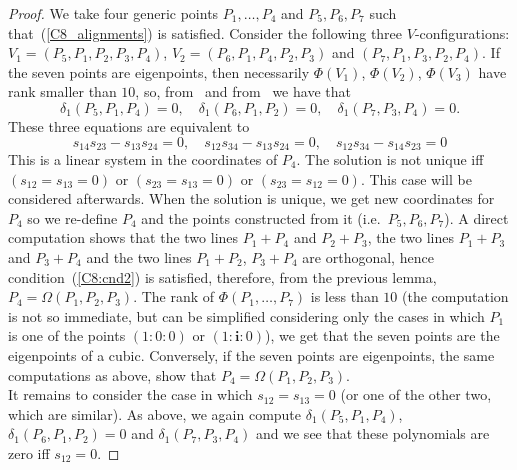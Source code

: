 \documentclass{amsart}
\theoremstyle{plain}
\theoremstyle{definition}
\newcommand{\iii}{\textbf{i}}
\begin{document}
\begin{proof}
We take four generic points
$P_1, \dots, P_4$ and $P_5, P_6, P_7$ such that~(\ref{C8_alignments})
is satisfied. Consider the following three $V$-configurations:
$V_1 = (P_5, P_1, P_2, P_3, P_4)$, $V_2 = (P_6, P_1, P_4, P_2, P_3)$
and $(P_7, P_1, P_3, P_2, P_4)$. If the seven points are eigenpoints,
then necessarily $\Phi(V_1)$, $\Phi(V_2)$, $\Phi(V_3)$ have rank
smaller than $10$, so, from~ and
from~
we have that 
\[
\delta_1(P_5, P_1, P_4) = 0, \quad \delta_1(P_6, P_1, P_2) = 0, \quad 
\delta_1(P_7, P_3, P_4) = 0.
\]
These three equations are equivalent to
\[
s_{14}s_{23}-s_{13}s_{24} = 0, \quad s_{12}s_{34}-s_{13}s_{24} = 0,
\quad s_{12}s_{34}-s_{14}s_{23} = 0
\]
This is a linear system in the coordinates of $P_4$. The solution is
not unique iff $(s_{12} = s_{13} = 0)$ or $(s_{23} = s_{13} = 0)$
or $(s_{23} = s_{12} = 0)$. This case will be considered afterwards.
When the solution is unique, we get new coordinates for $P_4$ so we
re-define $P_4$ and the points constructed from it (i.e.\ $P_5, P_6, P_7$).
A direct computation shows that the two lines $P_1+P_4$ and $P_2+P_3$,
the two lines $P_1+P_3$ and $P_3+P_4$ and the two lines $P_1+P_2$, $P_3+P_4$
are orthogonal, hence condition~(\ref{C8:cnd2}) is satisfied,
therefore, from the
previous lemma, $P_4 = \Omega(P_1, P_2, P_3)$. The rank
of $\Phi(P_1, \dotsc, P_7)$ is less than $10$ (the computation is
not so immediate, but can be simplified considering only the
cases in which $P_1$ is one of the points $(1: 0: 0)$ or
$(1: \iii: 0)$), we get that the seven points
are the eigenpoints of a cubic. Conversely, if the seven points are
eigenpoints, the same computations as above, show that
$P_4 = \Omega(P_1, P_2, P_3)$.\\
It remains to consider the case in which $s_{12} = s_{13} = 0$ (or one of
the other two, which are similar). As above, we again compute
$\delta_1(P_5, P_1, P_4)$, $\delta_1(P_6, P_1, P_2) = 0$ and 
$\delta_1(P_7, P_3, P_4)$ and we see that these  polynomials are zero
iff $s_{12} = 0$.
\end{proof}





\end{document}
